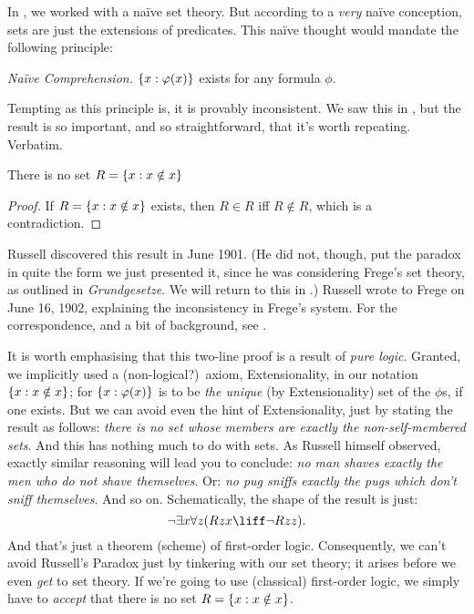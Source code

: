 \documentclass[../../../include/open-logic-section]{subfiles}
\begin{document}

In , we worked with a na\"{i}ve set theory. But
according to a \emph{very} na\"{i}ve conception, sets are just the
extensions of predicates. This na\"ive thought would mandate the
following principle:

\begin{defish}
  \emph{Na\"{i}ve Comprehension.} $\{ x : \varphi(x) \}$ exists for any formula $\phi$.
\end{defish}

Tempting as this principle is, it is provably inconsistent. We saw this in , but the result is so important, and so straightforward, that it's worth repeating. Verbatim.

\begin{thm}
There is no set $R = \{ x : x \notin x \}$
\end{thm}

\begin{proof}
If $R = \{ x : x \notin x \}$ exists, then
$R \in R$ iff $R \notin R$, which is a contradiction.
\end{proof}

Russell discovered this result in June 1901. (He did not, though, put
the paradox in quite the form we just presented it, since he was
considering Frege's set theory, as outlined in \emph{Grundgesetze}. We
will return to this in .) Russell wrote to
Frege on June 16, 1902, explaining the inconsistency in Frege's
system. For the correspondence, and a bit of background, see
\citet[pp.~124--8]{Heijenoort1967}. 

It is worth emphasising that this two-line proof is a result of
\emph{pure logic}. Granted, we implicitly used a (non-logical?)\ axiom, Extensionality, in our notation $\{ x : x \notin x \}$; for $\{ x : \varphi(x) \}$ is to be \emph{the unique} (by Extensionality) set of the $\phi$s, if one exists. But we can avoid even the hint of Extensionality, just by stating the result as follows:
\emph{there is no set whose members are exactly the non-self-membered
sets}. And this has nothing much to do with sets. As Russell himself observed, exactly similar reasoning
will lead you to conclude: \emph{no man shaves exactly the men who do
not shave themselves}. Or: \emph{no pug sniffs exactly the pugs which
don't sniff themselves}. And so on. Schematically, the shape of the
result is just: 
\[
\lnot \exists x \forall z(Rzx \liff \lnot R zz).
\]
And that's just a theorem (scheme) of first-order logic. Consequently,
we can't avoid Russell's Paradox just by tinkering with our set
theory; it arises before we even \emph{get} to set theory. If we're
going to use (classical) first-order logic, we simply have to
\emph{accept} that there is no set $R = \{ x : x\notin x \}$. 
\end{document}
